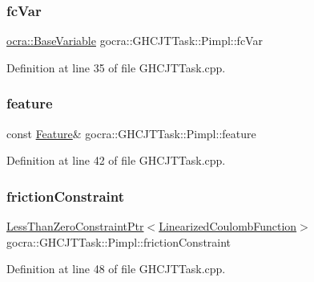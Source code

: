\subsubsection{\texorpdfstring{fc\+Var}{fcVar}}
{\footnotesize\ttfamily \hyperlink{classocra_1_1BaseVariable}{ocra\+::\+Base\+Variable} gocra\+::\+G\+H\+C\+J\+T\+Task\+::\+Pimpl\+::fc\+Var}



Definition at line 35 of file G\+H\+C\+J\+T\+Task.\+cpp.

\hypertarget{structgocra_1_1GHCJTTask_1_1Pimpl_aa7c75169490e6b35ff7bdb1baf696c5d}{}\label{structgocra_1_1GHCJTTask_1_1Pimpl_aa7c75169490e6b35ff7bdb1baf696c5d} 
\subsubsection{\texorpdfstring{feature}{feature}}
{\footnotesize\ttfamily const \hyperlink{classocra_1_1Feature}{Feature}\& gocra\+::\+G\+H\+C\+J\+T\+Task\+::\+Pimpl\+::feature}



Definition at line 42 of file G\+H\+C\+J\+T\+Task.\+cpp.

\hypertarget{structgocra_1_1GHCJTTask_1_1Pimpl_a51c9a1862cf46b8ac75a525924d990bb}{}\label{structgocra_1_1GHCJTTask_1_1Pimpl_a51c9a1862cf46b8ac75a525924d990bb} 
\subsubsection{\texorpdfstring{friction\+Constraint}{frictionConstraint}}
{\footnotesize\ttfamily \hyperlink{classocra_1_1LessThanZeroConstraintPtr}{Less\+Than\+Zero\+Constraint\+Ptr}$<$\hyperlink{classocra_1_1LinearizedCoulombFunction}{Linearized\+Coulomb\+Function}$>$ gocra\+::\+G\+H\+C\+J\+T\+Task\+::\+Pimpl\+::friction\+Constraint}



Definition at line 48 of file G\+H\+C\+J\+T\+Task.\+cpp.

\hypertarget{structgocra_1_1GHCJTTask_1_1Pimpl_ad92c2fff381cdb00f6afb41671e923c5}{}\label{structgocra_1_1GHCJTTask_1_1Pimpl_ad92c2fff381cdb00f6afb41671e923c5} 
